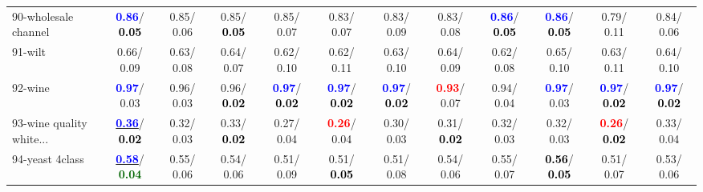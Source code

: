 \begin{table}[h]
\begin{center}
{\begin{tabular}{lc|c|c|c|c|c|c|c|c|c|c}
90-wholesale channel & \textcolor{blue}{\textbf{  0.86}}/\textcolor{black}{\textbf{  0.05}} &   0.85/  0.06 &   0.85/\textcolor{black}{\textbf{  0.05}} &   0.85/  0.07 &   0.83/  0.07 &   0.83/  0.09 &   0.83/  0.08 & \textcolor{blue}{\textbf{  0.86}}/\textcolor{black}{\textbf{  0.05}} & \textcolor{blue}{\textbf{  0.86}}/\textcolor{black}{\textbf{  0.05}} &   0.79/  0.11 &   0.84/  0.06 \\
91-wilt &   0.66/  0.09 &   0.63/  0.08 &   0.64/  0.07 &   0.62/  0.10 &   0.62/  0.11 &   0.63/  0.10 &   0.64/  0.09 &   0.62/  0.08 &   0.65/  0.10 &   0.63/  0.11 &   0.64/  0.10 \\
92-wine & \textcolor{blue}{\textbf{  0.97}}/  0.03 &   0.96/  0.03 &   0.96/\textcolor{black}{\textbf{  0.02}} & \textcolor{blue}{\textbf{  0.97}}/\textcolor{black}{\textbf{  0.02}} & \textcolor{blue}{\textbf{  0.97}}/\textcolor{black}{\textbf{  0.02}} & \textcolor{blue}{\textbf{  0.97}}/\textcolor{black}{\textbf{  0.02}} & \textcolor{red}{\textbf{  0.93}}/  0.07 &   0.94/  0.04 & \textcolor{blue}{\textbf{  0.97}}/  0.03 & \textcolor{blue}{\textbf{  0.97}}/\textcolor{black}{\textbf{  0.02}} & \textcolor{blue}{\textbf{  0.97}}/\textcolor{black}{\textbf{  0.02}} \\ \hline
93-wine quality white... & \underline{\textcolor{blue}{\textbf{  0.36}}}/\textcolor{black}{\textbf{  0.02}} &   0.32/  0.03 &   0.33/\textcolor{black}{\textbf{  0.02}} &   0.27/  0.04 & \textcolor{red}{\textbf{  0.26}}/  0.04 &   0.30/  0.03 &   0.31/\textcolor{black}{\textbf{  0.02}} &   0.32/  0.03 &   0.32/  0.03 & \textcolor{red}{\textbf{  0.26}}/\textcolor{black}{\textbf{  0.02}} &   0.33/  0.04 \\
94-yeast 4class & \underline{\textcolor{blue}{\textbf{  0.58}}}/\textcolor{darkgreen}{\textbf{  0.04}} &   0.55/  0.06 &   0.54/  0.06 &   0.51/  0.09 &   0.51/\textcolor{black}{\textbf{  0.05}} &   0.51/  0.08 &   0.54/  0.06 &   0.55/  0.07 & \textcolor{black}{\textbf{  0.56}}/\textcolor{black}{\textbf{  0.05}} &   0.51/  0.07 &   0.53/  0.06 \\\end{tabular}}\label{stratsBalAcc2aNB}
\end{center}
\end{table}

